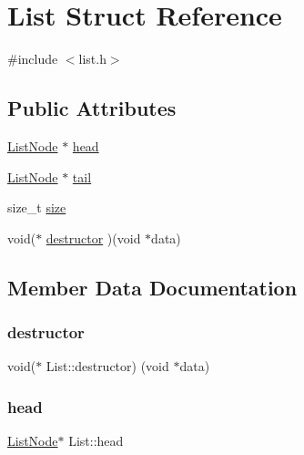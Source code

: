 \hypertarget{structList}{}\section{List Struct Reference}
\label{structList}


{\ttfamily \#include $<$list.\+h$>$}

\subsection*{Public Attributes}
\begin{DoxyCompactItemize}
\item 
\hyperlink{structListNode}{List\+Node} $\ast$ \hyperlink{structList_a6c5449b1dd158368840801d0cdc86f5e}{head}
\item 
\hyperlink{structListNode}{List\+Node} $\ast$ \hyperlink{structList_ac9c40d39dbdc778b9ca6264ac889e0b6}{tail}
\item 
size\+\_\+t \hyperlink{structList_a166530a166abd81afec0e6b0283f7e80}{size}
\item 
void($\ast$ \hyperlink{structList_ab67530a14c8b42938132808cba8202df}{destructor} )(void $\ast$data)
\end{DoxyCompactItemize}


\subsection{Member Data Documentation}
\hypertarget{structList_ab67530a14c8b42938132808cba8202df}{}\label{structList_ab67530a14c8b42938132808cba8202df} 
\subsubsection{\texorpdfstring{destructor}{destructor}}
{\footnotesize\ttfamily void($\ast$ List\+::destructor) (void $\ast$data)}

\hypertarget{structList_a6c5449b1dd158368840801d0cdc86f5e}{}\label{structList_a6c5449b1dd158368840801d0cdc86f5e} 
\subsubsection{\texorpdfstring{head}{head}}
{\footnotesize\ttfamily \hyperlink{structListNode}{List\+Node}$\ast$ List\+::head}

\hypertarget{structList_a166530a166abd81afec0e6b0283f7e80}{}\label{structList_a166530a166abd81afec0e6b0283f7e80} 
